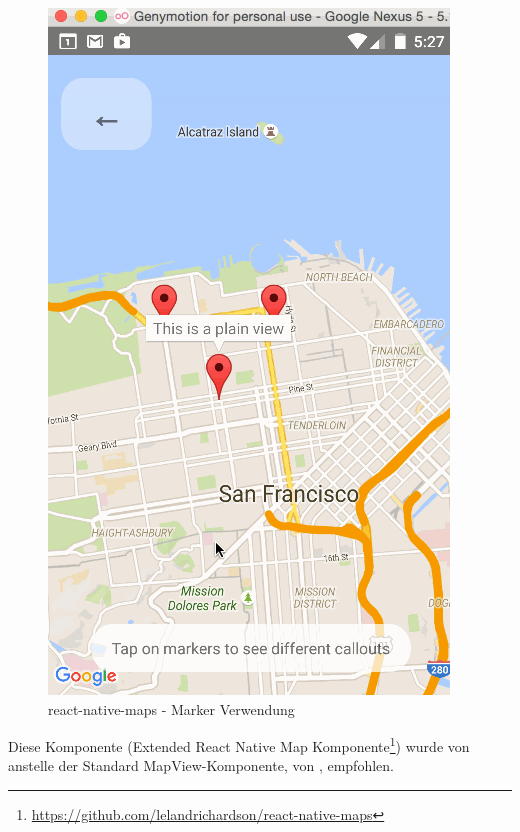 \begin{figure}[H]
	\centering
	\includegraphics[width=\textwidth]{images/technischer_bericht/lelandrichardson_react-native-maps.png}
	\caption{react-native-maps - Marker Verwendung}
	\label{image-variante-b-map}
\end{figure}

Diese Komponente (Extended React Native Map Komponente\footnote{\url{https://github.com/lelandrichardson/react-native-maps}}) wurde von  anstelle der Standard MapView-Komponente, von , empfohlen.


